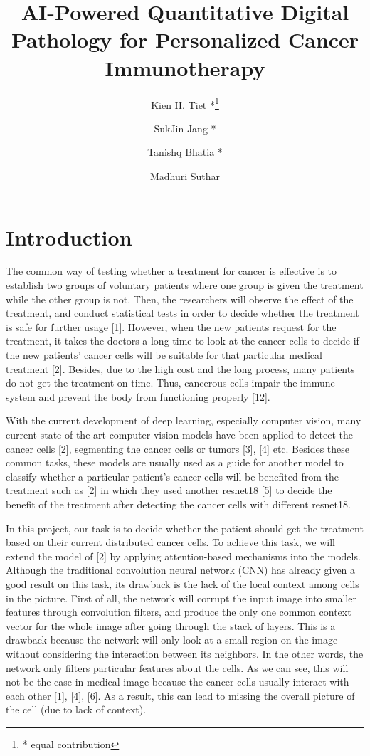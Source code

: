 \documentclass[letterpaper, 10 pt, journal]{ieeeconf}
\title{\LARGE \bf AI-Powered Quantitative Digital Pathology for Personalized Cancer Immunotherapy}
\author[1]{Kien H. Tiet *\thanks{* equal contribution}}
\author[1]{SukJin Jang *}
\author[1]{Tanishq Bhatia *}
\author[1]{Madhuri Suthar}
\affil[1]{University of California, Los Angeles}
\begin{document}
	
	\maketitle
	\thispagestyle{empty}
	\pagestyle{empty}

	\section{Introduction}

	The common way of testing whether a treatment for cancer is effective is to establish two groups of voluntary patients where one group is given the treatment while the other group is not. 
	Then, the researchers will observe the effect of the treatment, and conduct statistical tests in order to decide whether the treatment is safe for further usage [1]. However, when the new 
	patients request for the treatment, it takes the doctors a long time to look at the cancer cells to decide if the new patients' cancer cells will be suitable for that particular medical 
	treatment [2]. Besides, due to the high cost and the long process, many patients do not get the treatment on time. Thus, cancerous cells impair the immune system and prevent the body 
	from functioning properly [12].	
	
	With the current development of deep learning, especially computer vision, many current state-of-the-art computer vision models 
	have been applied to detect the cancer cells [2], segmenting the cancer cells or tumors [3], [4] etc. Besides these common tasks, 
	these models are usually used as a guide for another model to classify whether a particular patient's cancer cells will be benefited from the 
	treatment such as [2] in which they used another resnet18 [5] to decide the benefit of the treatment after detecting the cancer cells 
	with different resnet18.		
	
	In this project, our task is to decide whether the patient should get the treatment based on their current distributed cancer cells. 
	To achieve this task, we will extend the model of [2] by applying attention-based mechanisms into the models. Although the traditional 
	convolution neural network (CNN) has already given a good result on this task, its drawback is the lack of the local context among cells in 
	the picture. First of all, the network will corrupt the input image into smaller features through convolution filters, and produce the only one 
	common context vector for the whole image after going through the stack of layers. This is a drawback because the network will only look at a 
	small region on the image without considering the interaction between its neighbors. In the other words, the network only filters particular features 
	about the cells. As we can see, this will not be the case in medical image because the cancer cells usually interact with each other [1], [4], [6]. 
	As a result, this can lead to missing the overall picture of the cell (due to lack of context).	
	
\end{document}
